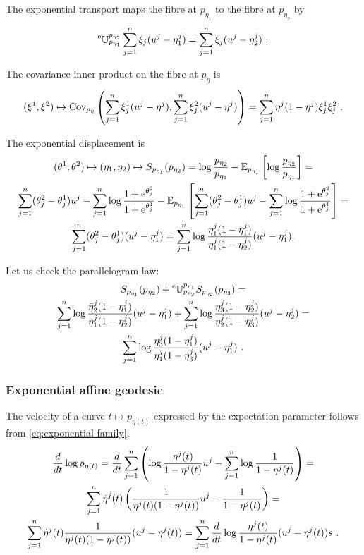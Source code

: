 \documentclass[12pt,a4paper]{amsart}
\theoremstyle{remark}
\begin{document}
The exponential transport maps the fibre at $p_{\eta_1}$ to the fibre at $p_{\eta_2}$ by
\begin{equation}
  \label{eq:49}
  \prescript{\text{e}}{} {\mathbb U} _ {p_{\eta_1}} ^ {p_{\eta_2}} \sum_{j=1}^n \xi_j(u^j - \eta^j_1) = \sum_{j=1}^n \xi_j(u^j - \eta^j_2) \ .
\end{equation}

The covariance inner product on the fibre at $p_\eta$ is
\begin{equation}
  \label{eq:29}
(\xi^1,\xi^2) \mapsto  \operatorname{Cov}_{p_\eta}\left(\sum_{j=1}^n \xi_j^1 (u^j - \eta^j),\sum_{j=1}^n  \xi_j^2(u^j-\eta^j)\right) = \sum_{j=1}^n \eta^j(1-\eta^j) \xi_j^1 \xi_j^2 \ .
\end{equation}

The exponential displacement is
\begin{multline}
  \label{eq:30}
  (\theta^1,\theta^2) \mapsto (\eta_1,\eta_2) \mapsto
  S_{p_{\eta_1}}(p_{\eta_2}) = \log \frac {p_{\eta_2}}{p_{\eta_1}} - \operatorname{\mathbb E}_{p_{\eta_1}}\left[\log \frac {p_{\eta_2}}{p_{\eta_1}}\right] = \\
  \sum_{j=1}^n (\theta^2_j - \theta_j^1) u^j - \sum_{j=1}^n \log \frac {1 + \mathrm{e}^{\theta_j^2}}{1 + \mathrm{e}^{\theta_j^1}} - \operatorname{\mathbb E}_{p_{\eta_1}}\left[ \sum_{j=1}^n (\theta_j^2 - \theta_j^1) u^j - \sum_{j=1}^n \log \frac {1 + \mathrm{e}^{\theta_j^2}}{1 + \mathrm{e}^{\theta_j^1}}\right] = \\
  \sum_{j=1}^n (\theta_j^2 - \theta_j^1)(u^j - \eta^j_1) = \sum_{j=1}^n \log \frac {\eta^j_1(1 - \eta^j_1)}{\eta^j_1 (1-\eta^j_2)} (u^j - \eta^j_1) .
\end{multline}

Let us check the parallelogram law:
\begin{multline}
  \label{eq:31}
  S_{p_{\eta_1}}(p_{\eta_2}) + \prescript{\text{e}}{} {\mathbb U} _ {p_{\eta_2}} ^ {p_{\eta_1}} S_{p_{\eta_2}}(p_{\eta_3}) = \\ 
  \sum_{j=1}^n \log \frac {\bar \eta^j_2(1 - \eta^j_1)}{\eta^j_1 (1- \eta^j_2)} (u^j - \eta^j_1) + \sum_{j=1}^n \log \frac {\eta_3^j(1 - \eta_2^j)}{\eta^j_2 (1- \eta_3^j)} (u^j - \eta^j_2) = \\
  \sum_{j=1}^n \log \frac {\eta^j_3(1 - \eta^j_1)}{\eta^j_1 (1- \eta_3^j)} (u^j - \eta^j_1) \ .
\end{multline}

\subsubsection{Exponential affine geodesic}
\label{sec:expon-affine-geod}
The velocity of a curve $t \mapsto p_{\eta(t)}$ expressed by the expectation parameter follows from \cref{eq:exponential-family},
\begin{multline}
  \label{eq:32}
 \frac{d}{dt} \log p_{\eta(t)} =  \frac{d}{dt} \sum_{j=1}^n \left(\log \frac{\eta^j(t)}{1-\eta^j(t)} u^j - \sum_{j=1}^n \log \frac 1 {1 - \eta^j(t)}\right) = \\
  \sum_{j=1}^n \dot \eta^j(t) \left(\frac 1 {\eta^j(t)(1 - \eta^j(t))}u^j - \frac 1 {1 - \eta^j(t)}\right) = \\
    \sum_{j=1}^n \dot \eta^j(t) \frac{1}{\eta^j(t)(1 - \eta^j(t))} (u^j - \eta^j(t)) = \sum_{j=1}^n \frac{d}{dt} \log \frac {\eta^j(t)}{1 - \eta^j(t)} (u^j - \eta^j(t))s \ .
\end{multline}
\end{document}
